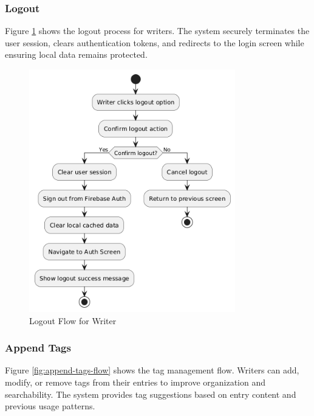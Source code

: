 \subsubsection{Logout}\label{subsubsec:logout}

Figure \ref{fig:logout-flow} shows the logout process for writers. The system securely terminates the user session, clears authentication tokens, and redirects to the login screen while ensuring local data remains protected.

\begin{figure}[H]
\centering
\includegraphics[width=0.8\textwidth]{files/imgs/logout_flow.png}
\caption{Logout Flow for Writer}
\label{fig:logout-flow}
\end{figure}

\subsubsection{Append Tags}\label{subsubsec:appendTags}

Figure \ref{fig:append-tags-flow} shows the tag management flow. Writers can add, modify, or remove tags from their entries to improve organization and searchability. The system provides tag suggestions based on entry content and previous usage patterns.

